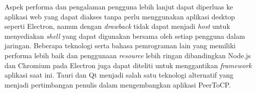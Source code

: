 Aspek performa dan pengalaman pengguna lebih lanjut dapat diperluas ke aplikasi web yang dapat diakses tanpa perlu menggunakan aplikasi desktop seperti Electron, namun dengan \textit{drawback} tidak dapat menjadi \textit{host} untuk menyediakan \textit{shell} yang dapat digunakan bersama oleh setiap pengguna dalam jaringan. Beberapa teknologi serta bahasa pemrograman lain yang memiliki performa lebih baik dan penggunaan \textit{resource} lebih ringan dibandingkan Node.js dan Chromium pada Electron juga dapat diteliti untuk menggantikan \textit{framework} aplikasi saat ini. Tauri dan Qt menjadi salah satu teknologi alternatif yang menjadi pertimbangan penulis dalam mengembangkan aplikasi PeerToCP.
